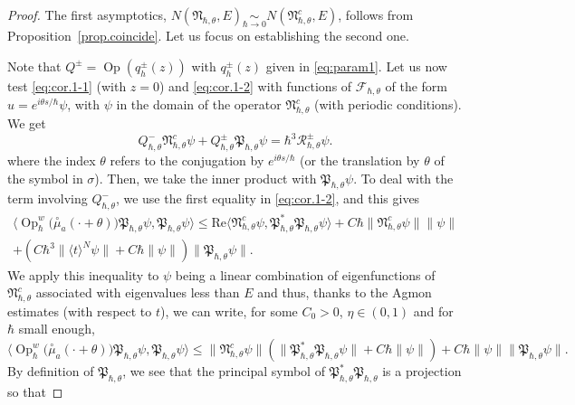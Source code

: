 \documentclass[JEP,XML,SOM,Unicode,NoFloatCountersInSection,published]{cedram}
\DeclareMathOperator{\Op}{Op}
\theoremstyle{plain}
\theoremstyle{definition}
\renewcommand{\Re}{\mathrm{Re}}
\begin{document}
\begin{proof}
The first asymptotics, $N(\mathfrak{N}_{\hbar,\theta},E)\underset{\hbar\to 0}\sim N(\mathfrak{N}^c_{\hbar,\theta},E)$, follows from Proposition~\ref{prop.coincide}.
Let us focus on establishing the second one.


Note that $Q^\pm=\Op(q_{h}^\pm(z))$ with $q_h^{\pm}(z)$ given in \eqref{eq:param1}. Let us now test \eqref{eq:cor.1-1} (with $z=0$) and \eqref{eq:cor.1-2} with functions of $\mathscr{F}_{\hbar, \theta}$ of the form $u=e^{i\theta s/\hbar}\psi$, with $\psi$ in the domain of the operator $\mathfrak{N}_{\hbar,\theta}^c$ (with periodic conditions). We get
\begin{equation}\label{eq.Qpm}
Q^-_{\hbar,\theta}\mathfrak{N}_{\hbar,\theta}^c\psi+Q^\pm_{\hbar,\theta}\mathfrak{P}_{\hbar,\theta}\psi=\hbar^3\mathscr R_{\hbar,\theta}^\pm\psi.
\end{equation}
where the index $\theta$ refers to the conjugation by $e^{i\theta s/\hbar}$ (or the translation by $\theta$ of the symbol in $\sigma$). Then, we take the inner product with $\mathfrak{P}_{\hbar,\theta}\psi$. To deal with the term involving $Q^-_{\hbar,\theta}$, we use the first equality in \eqref{eq:cor.1-2}, and this gives
\begin{multline}\label{eq.ubqpm}
\langle\Op^w_\hbar\bigl(\overset{\circ}{\mu}_a(\cdot+\theta)\bigr)\mathfrak{P}_{\hbar,\theta}\psi,\mathfrak{P}_{\hbar,\theta}\psi\rangle\leq\Re \langle \mathfrak{N}^c_{\hbar,\theta}\psi,\mathfrak{P}^*_{\hbar,\theta}\mathfrak{P}_{\hbar,\theta}\psi\rangle
+C\hbar\|\mathfrak{N}^c_{\hbar,\theta}\psi\|\|\psi\|\\
+(C\hbar^3\|\langle t\rangle ^N\psi\|+C\hbar\|\psi\|)\|\mathfrak{P}_{\hbar,\theta}\psi\|.
\end{multline}
We apply this inequality to $\psi$ being a linear combination of eigenfunctions of $\mathfrak N_{\hbar,\theta}^c$ associated with eigenvalues less than $E$ and thus, thanks to the Agmon estimates (with respect to $t$), we can write, for some $C_0>0$, $\eta\in(0,1)$ and for $\hbar$ small enough,
\[
\langle\Op^w_\hbar\bigl(\overset{\circ}{\mu}_a(\cdot+\theta)\bigr)\mathfrak{P}_{\hbar,\theta}\psi,\mathfrak{P}_{\hbar,\theta}\psi\rangle\leq \|\mathfrak{N}^c_{\hbar,\theta}\psi\|(\|\mathfrak{P}^*_{\hbar,\theta}\mathfrak{P}_{\hbar,\theta}\psi\|+C\hbar\|\psi\|) +C\hbar\|\psi\|\|\mathfrak{P}_{\hbar,\theta}\psi\|.
\]
By definition of $\mathfrak{P}_{\hbar,\theta}$, we see that the principal symbol of $\mathfrak{P}^*_{\hbar,\theta}\mathfrak{P}_{\hbar,\theta}$ is a projection so that

\end{proof}
\end{document}
